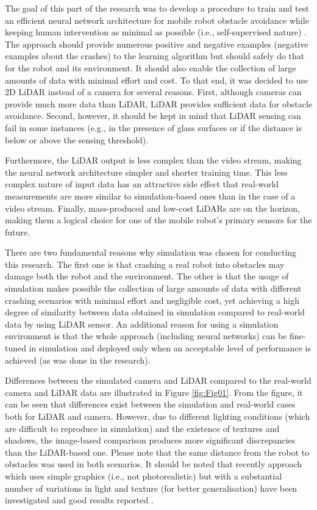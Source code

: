 The goal of this part of the research was to develop a procedure to train and test an efficient neural network architecture for mobile robot obstacle avoidance while keeping human intervention as minimal as possible (i.e., self-supervised nature) \cite{Kruzic2020a}. The approach should provide numerous positive and negative examples (negative examples about the crashes) to the learning algorithm but should safely do that for the robot and its environment.  It should also enable the collection of large amounts of data with minimal effort and cost. To that end, it was decided to use 2D LiDAR instead of a camera for several reasons. First, although cameras can provide much more data than LiDAR, LiDAR provides sufficient data for obstacle avoidance. Second, however, it should be kept in mind that LiDAR sensing can fail in some instances (e.g., in the presence of glass surfaces or if the distance is below or above the sensing threshold). 

Furthermore, the LiDAR output is less complex than the video stream, making the neural network architecture simpler and shorter training time. This less complex nature of input data has an attractive side effect that real-world measurements are more similar to simulation-based ones than in the case of a video stream. Finally, mass-produced and low-cost LiDARs are on the horizon, making them a logical choice for one of the mobile robot's primary sensors for the future.

There are two fundamental reasons why simulation was chosen for conducting this research. The first one is that crashing a real robot into obstacles may damage both the robot and the environment. The other is that the usage of simulation makes possible the collection of large amounts of data with different crashing scenarios with minimal effort and negligible cost, yet achieving a high degree of similarity between data obtained in simulation compared to real-world data by using LiDAR sensor. An additional reason for using a simulation environment is that the whole approach (including neural networks) can be fine-tuned in simulation and deployed only when an acceptable level of performance is achieved (as was done in the research).

Differences between the simulated camera and LiDAR compared to the real-world camera and LiDAR data are illustrated in Figure \ref{fig:Fig01}. From the figure, it can be seen that differences exist between the simulation and real-world cases both for LiDAR and camera. However, due to different lighting conditions (which are difficult to reproduce in simulation) and the existence of textures and shadows, the image-based comparison produces more significant discrepancies than the LiDAR-based one. Please note that the same distance from the robot to obstacles was used in both scenarios. It should be noted that recently approach which uses simple graphics (i.e., not photorealistic) but with a substantial number of variations in light and texture (for better generalisation) have been investigated and good results reported \cite{Bousmalis2018}.

